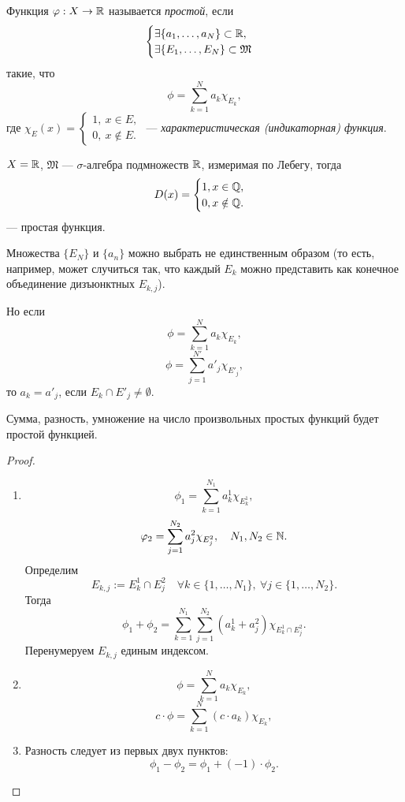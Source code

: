 \begin{definition}
    Функция $\varphi: X \to \mathbb{R}$ называется \textit{простой}, если
    \[\begin{cases}
        \exists \{a_1, \dots, a_N\} \subset \mathbb{R},\\
        \exists \{E_1, \dots, E_N\} \subset \mathfrak{M}
    \end{cases}
    \]
    такие, что
    \[\phi = \sum\limits_{k=1}^{N}a_k \chi_{E_k},\]
    где $\chi_E(x) = \begin{cases}
        1, \ x \in E, \\
        0, \ x \notin E.
    \end{cases}
    $ — \textit{характеристическая (индикаторная) функция}.
\end{definition} 

\begin{example}
    $X = \mathbb{R}$, $\mathfrak{M}$ — $\sigma$-алгебра подмножеств $\mathbb{R}$, измеримая по Лебегу, тогда
    \[D(x) = 
    \begin{cases}
        1, x \in \mathbb{Q},\\
        0, x \notin \mathbb{Q}.
    \end{cases}
    \]
    — простая функция.
\end{example}

\begin{remark}
    Множества $\{E_N\}$ и $\{a_n\}$ можно выбрать не единственным образом (то есть, например, может случиться так, что каждый $E_k$ можно представить как конечное объединение дизъюнктных $E_{k,j}$).

    Но если 
    \[\phi = \sum\limits_{k=1}^{N} a_k \chi_{E_k},\]
    \[\phi = \sum\limits_{j=1}^{N'}a'_j \chi_{E'_j},\]
    то $a_k = a'_j$, если $E_k \cap E'_j \neq \emptyset$.
\end{remark}

\begin{theorem}
    Сумма, разность, умножение на число произвольных простых функций будет простой функцией.
\end{theorem} 
\begin{proof}\tab
    \begin{enumerate}
        \item
        \[\phi_1 = \sum\limits_{k=1}^{N_1} a_k^1 \chi_{E_k^1},\]
        \[\varphi_2 = \sum\limits_{j=1}^{N_2} a_j^2 \chi_{E_j^2}, \quad N_1, N_2 \in \mathbb{N}.\]
        Определим
        \[E_{k,j} := E_k^1 \cap E_j^2 \quad \forall k \in \{1, \dots, N_1\}, \ \forall j \in \{1, \dots, N_2\}.\]
        Тогда
        \[\phi_1 + \phi_2 = \sum\limits_{k=1}^{N_1} \sum\limits_{j=1}^{N_2} (a_k^1 + a_j^2) \chi_{E_k^1 \cap E_j^2}.\]
        Перенумеруем $E_{k,j}$ единым индексом.
        \item
        \[\phi = \sum\limits_{k=1}^{N} a_k \chi_{E_k},\]
        \[c \cdot \phi = \sum\limits_{k=1}^{N} (c \cdot a_k) \chi_{E_k},\]
        \item Разность следует из первых двух пунктов:
        \[\phi_1 - \phi_2 = \phi_1 + (-1) \cdot \phi_2.\]
    \end{enumerate}
\end{proof} 

